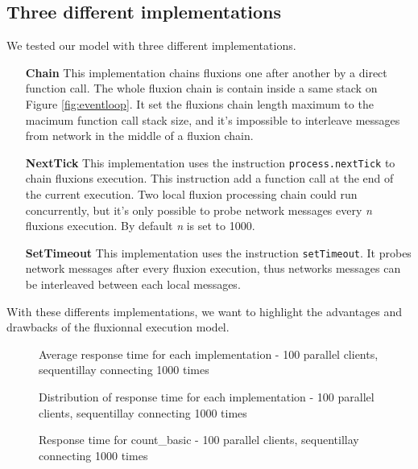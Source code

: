 \subsection{Three different implementations}

We tested our model with three different implementations.

\begin{itemize}
	\item[\textbf{Chain}]
		This implementation chains fluxions one after another by a direct function call.
		The whole fluxion chain is contain inside a same stack on Figure \ref{fig:eventloop}.
		It set the fluxions chain length maximum to the macimum function call stack size, and it's impossible to interleave messages from network in the middle of a fluxion chain.

	\item[\textbf{NextTick}]
		This implementation uses the instruction \texttt{process.nextTick} to chain fluxions execution.
		This instruction add a function call at the end of the current execution.
		Two local fluxion processing chain could run concurrently, but it's only possible to probe network messages every \textit{n} fluxions execution.
		By default \textit{n} is set to 1000.

	\item[\textbf{SetTimeout}]
		This implementation uses the instruction \texttt{setTimeout}.
		It probes network messages after every fluxion execution, thus networks messages can be interleaved between each local messages.
\end{itemize}

With these differents implementations, we want to highlight the advantages and drawbacks of the fluxionnal execution model.

\begin{figure}

\caption{Average response time for each implementation - 100 parallel clients, sequentillay connecting 1000 times}
\label{fig:reponsetime}
\end{figure}

\begin{figure}

\caption{Distribution of response time for each implementation - 100 parallel clients, sequentillay connecting 1000 times}
\label{fig:distribution}
\end{figure}

\begin{figure}

\caption{Response time for count\_basic - 100 parallel clients, sequentillay connecting 1000 times}
\label{fig:timecountbasic}
\end{figure}

